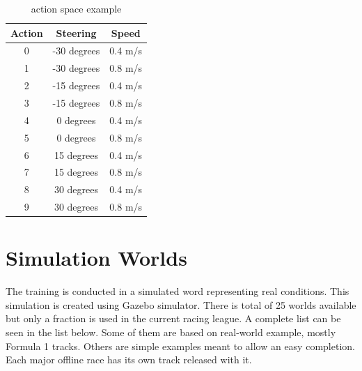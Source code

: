 \begin{table}
\centering
\begin{tabular}{||c c c||} 
 \hline
 \textbf{Action} & \textbf{Steering} & \textbf{Speed} \\ 
 \hline\hline
 0 & -30 degrees & 0.4 m/s \\ 
 1 & -30 degrees & 0.8 m/s \\
 2 & -15 degrees & 0.4 m/s \\
 3 & -15 degrees & 0.8 m/s \\
 4 & 0 degrees & 0.4 m/s \\ 
 5 & 0 degrees & 0.8 m/s \\
 6 & 15 degrees & 0.4 m/s \\
 7 & 15 degrees & 0.8 m/s \\
 8 & 30 degrees & 0.4 m/s \\
 9 & 30 degrees & 0.8 m/s \\
 \hline
\end{tabular}
\caption{action space example}
\label{table:action_space}
\end{table}

\section{Simulation Worlds}
The training is conducted in a simulated word representing real conditions. This simulation is created using Gazebo simulator. There is total of 25 worlds available but only a fraction is used in the current racing league. A complete list can be seen in the list below. Some of them are based on real-world example, mostly Formula 1 tracks. Others are simple examples meant to allow an easy completion. Each major offline race has its own track released with it. 

